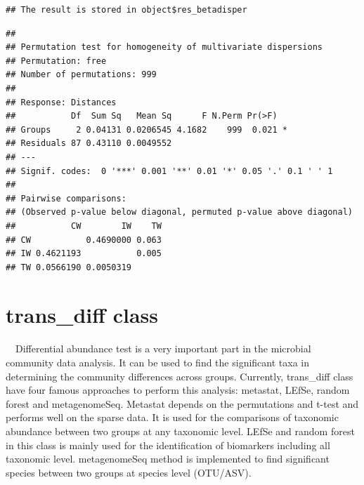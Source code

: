 \documentclass[
]{book}
\newenvironment{Shaded}{\begin{snugshade}}{\end{snugshade}}
\newcommand{\NormalTok}[1]{#1}
\newcommand{\SpecialCharTok}[1]{\textcolor[rgb]{0.00,0.00,0.00}{#1}}
\begin{document}
\begin{verbatim}
## The result is stored in object$res_betadisper
\end{verbatim}

\begin{Shaded}
\end{Shaded}

\begin{verbatim}
## 
## Permutation test for homogeneity of multivariate dispersions
## Permutation: free
## Number of permutations: 999
## 
## Response: Distances
##           Df  Sum Sq   Mean Sq      F N.Perm Pr(>F)  
## Groups     2 0.04131 0.0206545 4.1682    999  0.021 *
## Residuals 87 0.43110 0.0049552                       
## ---
## Signif. codes:  0 '***' 0.001 '**' 0.01 '*' 0.05 '.' 0.1 ' ' 1
## 
## Pairwise comparisons:
## (Observed p-value below diagonal, permuted p-value above diagonal)
##           CW        IW    TW
## CW           0.4690000 0.063
## IW 0.4621193           0.005
## TW 0.0566190 0.0050319
\end{verbatim}

\hypertarget{trans_diff-class}{%
\section{trans\_diff class}\label{trans_diff-class}}

　Differential abundance test is a very important part in the microbial community data analysis.
It can be used to find the significant taxa in determining the community differences across groups.
Currently, trans\_diff class have four famous approaches to perform this analysis:
metastat\citep{White_Statistical_2009}, LEfSe\citep{Segata_Metagenomic_2011}, random forest and metagenomeSeq\citep{Paulson_Differential_2013}.
Metastat depends on the permutations and t-test and performs well on the sparse data.
It is used for the comparisons of taxonomic abundance between two groups at any taxonomic level.
LEfSe and random forest in this class is mainly used for the identification of biomarkers including all taxonomic level.
metagenomeSeq method is implemented to find significant species between two groups at species level (OTU/ASV).
\end{document}
